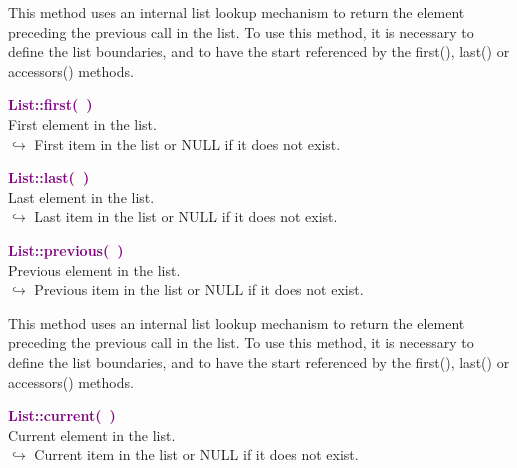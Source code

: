 This method uses an internal list lookup mechanism to return the element preceding the previous call in the list.
To use this method, it is necessary to define the list boundaries, and to have the start referenced by the first(), last() or accessors() methods.

\textcolor{purple}{\textbf{List::first(~)}}\label{List::first()}\\
First element in the list.\\ \hspace*{10mm}$\hookrightarrow$ First item in the list or NULL if it does not exist.


\textcolor{purple}{\textbf{List::last(~)}}\label{List::last()}\\
Last element in the list.\\ \hspace*{10mm}$\hookrightarrow$ Last item in the list or NULL if it does not exist.


\textcolor{purple}{\textbf{List::previous(~)}}\label{List::previous()}\\
Previous element in the list.\\ \hspace*{10mm}$\hookrightarrow$ Previous item in the list or NULL if it does not exist.

This method uses an internal list lookup mechanism to return the element preceding the previous call in the list.
To use this method, it is necessary to define the list boundaries, and to have the start referenced by the first(), last() or accessors() methods.

\textcolor{purple}{\textbf{List::current(~)}}\label{List::current()}\\
Current element in the list.\\ \hspace*{10mm}$\hookrightarrow$ Current item in the list or NULL if it does not exist.


